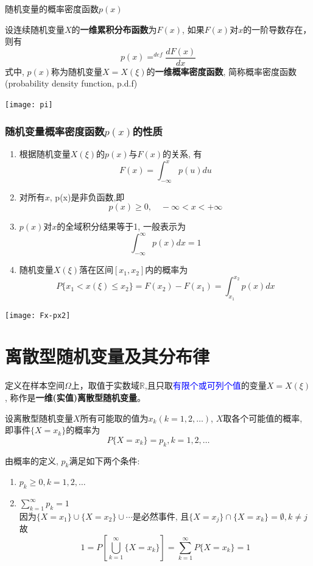 \begin{frame}{随机变量的概率密度函数$p(x)$}
\begin{definition}
	设连续随机变量$X$的\textbf{一维累积分布函数}为$F(x)$, 如果$F(x)$对$x$的一阶导数存在，则有
	\[p(x)\mathop{=}^{def}\frac{dF(x)}{dx}\]
	式中, $p(x)$称为随机变量$X=X(\xi)$的\textbf{一维概率密度函数}, 简称概率密度函数(probability density function, p.d.f)
\end{definition}
\texttt{[image: pi]}
\end{frame}

\begin{frame}[shrink]
\frametitle{随机变量概率密度函数$p(x)$的性质}
\begin{enumerate}
	\item 根据随机变量$X(\xi)$的$p(x)$与$F(x)$的关系, 有
	\[F(x)=\int_{-\infty}^{x}p(u)du\]
	\item 对所有$x$, p(x)是非负函数,即
	\[p(x)\ge 0,\quad -\infty<x<+\infty \]
	\item $p(x)$对$x$的全域积分结果等于1, 一般表示为
	\[\int_{-\infty}^{\infty}p(x)dx=1\]
	\item 随机变量$X(\xi)$落在区间$[x_1,x_2]$内的概率为
	\[P\{x_1<x(\xi)\le x_2\}=F(x_2)-F(x_1)=\int_{x_1}^{x_2}p(x)dx\]
\end{enumerate}
\texttt{[image: Fx-px2]}
\end{frame}

\section{离散型随机变量及其分布律}

\begin{frame}[shrink]
\begin{definition}[离散型随机变量]
	定义在样本空间$\Omega$上，取值于实数域$\mathbb{R}$,且只取\textcolor{blue}{有限个或可列个值}的变量$X=X(\xi)$, 称作是\textbf{一维(实值)离散型随机变量}。\\
\end{definition}

\begin{definition}[离散型随机变量的概率]
	设离散型随机变量$X$所有可能取的值为$x_k(k=1,2,\dots)$, $X$取各个可能值的概率, 即事件$\{X=x_k\}$的概率为
	\[P\{X=x_k\}=p_k, k=1,2,\dots\]
\end{definition}

由概率的定义, $p_k$满足如下两个条件: 
\begin{enumerate}
	\item $p_k\ge 0, k=1,2,\dots$
	\item $\sum\limits_{k=1}^{\infty}p_k=1$\\
	因为$\{X=x_1\}\cup\{X=x_2\}\cup\cdots$是必然事件, 且$\{X=x_j\}\cap\{X=x_k\}=\emptyset, k\ne j$故
	\[1=P[\bigcup_{k=1}^{\infty}\{X=x_k\}]=\sum_{k=1}^{\infty}P\{X=x_k\}=1 \]
\end{enumerate}
\end{frame}

